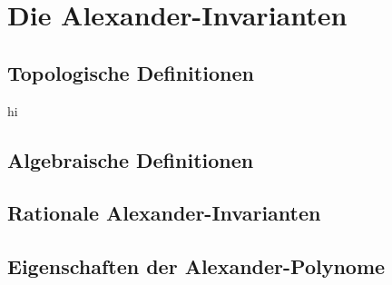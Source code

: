
\section{Die Alexander-Invarianten}
    

   \subsection{Topologische Definitionen}
       
       hi
    \subsection{Algebraische Definitionen}
        
    \subsection{Rationale Alexander-Invarianten}
        

    \subsection{Eigenschaften der Alexander-Polynome}
        